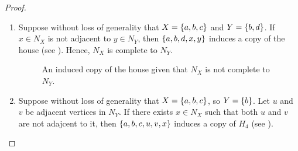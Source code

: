 \begin{proof}
    \leavevmode \par
    \begin{enumerate}[label=(\roman*)]
        \item Suppose without loss of generality that $X=\left\{a,b,c\right\}$ and
            $Y=\left\{b,d\right\}$. If $x\in N_X$ is not adjacent to $y\in N_Y$, then
            $\left\{a,b,d,x,y\right\}$ induces a copy of the house (see ).
            Hence, $N_X$ is complete to $N_Y$.

            \begin{figure}[htb!]
                \centering
                \caption{An induced copy of the house given that $N_X$ is not
                    complete to $N_Y$.}
                \label{fig:comp_1}
            \end{figure}
        
        \item Suppose without loss of generality that $X=\left\{a,b,c\right\}$, so
            $Y=\left\{b\right\}$. Let $u$ and $v$ be adjacent vertices in $N_Y$. If there
            exists $x\in N_X$ such that both $u$ and $v$ are not adajcent to it,
            then $\left\{a,b,c,u,v,x\right\}$ induces a copy of $H_4$ (see
            ).

            \begin{figure}[htb!]
                \centering
\end{figure}
\end{enumerate}
\end{proof}
